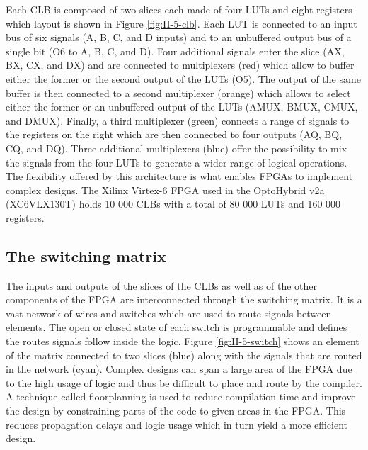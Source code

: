       Each CLB is composed of two slices each made of four LUTs and eight registers which layout is shown in Figure \ref{fig:II-5-clb}. Each LUT is connected to an input bus of six signals (A, B, C, and D inputs) and to an unbuffered output bus of a single bit (O6 to A, B, C, and D). Four additional signals enter the slice (AX, BX, CX, and DX) and are connected to multiplexers (red) which allow to buffer either the former or the second output of the LUTs (O5). The output of the same buffer is then connected to a second multiplexer (orange) which allows to select either the former or an unbuffered output of the LUTs (AMUX, BMUX, CMUX, and DMUX). Finally, a third multiplexer (green) connects a range of signals to the registers on the right which are then connected to four outputs (AQ, BQ, CQ, and DQ). Three additional multiplexers (blue) offer the possibility to mix the signals from the four LUTs to generate a wider range of logical operations. The flexibility offered by this architecture is what enables FPGAs to implement complex designs. The Xilinx Virtex-6 FPGA used in the OptoHybrid v2a (XC6VLX130T) holds 10 000 CLBs with a total of 80 000 LUTs and 160 000 registers.

    \subsection{The switching matrix}

      The inputs and outputs of the slices of the CLBs as well as of the other components of the FPGA are interconnected through the switching matrix. It is a vast network of wires and switches which are used to route signals between elements. The open or closed state of each switch is programmable and defines the routes signals follow inside the logic. Figure \ref{fig:II-5-switch} shows an element of the matrix connected to two slices (blue) along with the signals that are routed in the network (cyan). Complex designs can span a large area of the FPGA due to the high usage of logic and thus be difficult to place and route by the compiler. A technique called floorplanning is used to reduce compilation time and improve the design by constraining parts of the code to given areas in the FPGA. This reduces propagation delays and logic usage which in turn yield a more efficient design.

